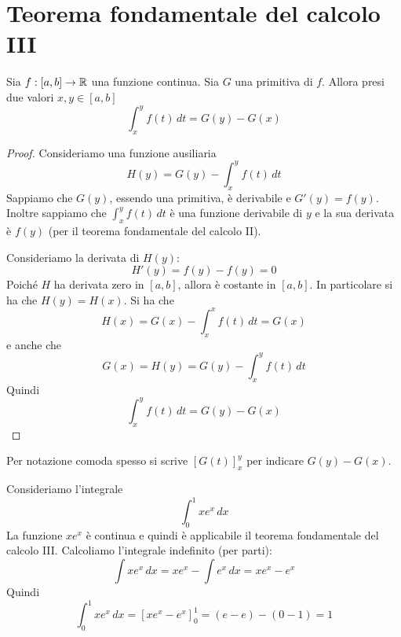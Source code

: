 \section{Teorema fondamentale del calcolo III}

\begin{theorem}
Sia $f:[a,b] \to \mathbb R$ una funzione continua. Sia $G$ una primitiva di $f$. Allora presi due valori $x,y \in [a,b]$
\begin{equation*}
\int_x^y f(t) \, dt = G(y) - G(x)
\end{equation*}
\end{theorem}

\begin{proof}
Consideriamo una funzione ausiliaria
\begin{equation*}
H(y) = G(y) - \int_x^y f(t) \, dt
\end{equation*}
Sappiamo che $G(y)$, essendo una primitiva, è derivabile e $G'(y) = f(y)$. Inoltre sappiamo che $\int_x^y f(t) \, dt$ è una funzione derivabile di $y$ e la sua derivata è $f(y)$ (per il teorema fondamentale del calcolo II).

Consideriamo la derivata di $H(y)$:
\begin{equation*}
H'(y) = f(y) - f(y) = 0
\end{equation*}
Poiché $H$ ha derivata zero in $[a,b]$, allora è costante in $[a,b]$. In particolare si ha che $H(y) = H(x)$. Si ha che
\begin{equation*}
H(x) = G(x) - \int_x^x f(t) \, dt = G(x)
\end{equation*}
e anche che
\begin{equation*}
G(x) = H(y) = G(y) - \int_x^y f(t) \, dt
\end{equation*}
Quindi
\begin{equation*}
\int_x^y f(t) \, dt = G(y) - G(x)
\end{equation*}
\end{proof}

Per notazione comoda spesso si scrive $[G(t)]_x^y$ per indicare $G(y)-G(x)$.

\begin{example}
Consideriamo l'integrale
\begin{equation*}
\int_0^1 xe^x \, dx
\end{equation*}
La funzione $xe^x$ è continua e quindi è applicabile il teorema fondamentale del calcolo III. Calcoliamo l'integrale indefinito (per parti):
\begin{equation*}
\int xe^x \, dx = xe^x - \int e^x \, dx = xe^x - e^x
\end{equation*}
Quindi
\begin{equation*}
\int_0^1 xe^x \, dx = [xe^x - e^x]_0^1 = (e-e)-(0-1) = 1
\end{equation*}
\end{example}

